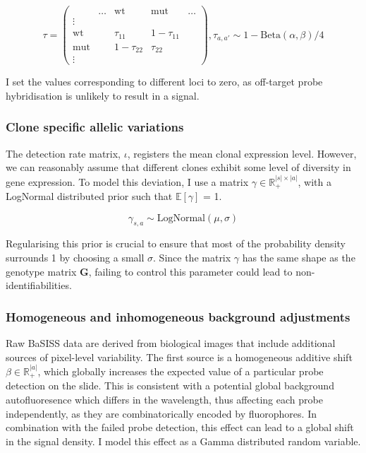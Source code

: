 \begin{equation}
 {\tau} = \left(\begin{array}{c|cccc}
       & \ldots & \text{wt} & \text{mut} & \ldots \\ 
\hline
 \vdots &  &        &        & \\
\text{wt}      &  & \tau_{11} & 1-\tau_{11} &  \\
\text{mut}     &  & 1-\tau_{22} & \tau_{22} &  \\
\vdots  &  &        &        & 
\end{array}\right), {\tau}_{a,a'} \sim 1-\text{Beta}(\alpha, \beta)/4
\end{equation}

I set the values corresponding to different loci to zero, as off-target probe hybridisation is unlikely to result in a signal.

\subsubsection*{Clone specific allelic variations}

The detection rate matrix, $\iota$, registers the mean clonal expression level. However, we can reasonably assume that different clones exhibit some level of diversity in gene expression. To model this deviation, I use a matrix $\gamma \in \mathbb{R}_{+}^{|s|\times|a|}$, with a LogNormal distributed prior such that $\mathbb{E}[\gamma]$ = 1.

\begin{equation} 
\gamma_{s,a} \sim \text{LogNormal}(\mu, \sigma)
\end{equation}

Regularising this prior is crucial to ensure that most of the probability density surrounds 1 by choosing a small $\sigma$. Since the matrix $\gamma$ has the same shape as the genotype matrix $\mathbf{G}$, failing to control this parameter could lead to non-identifiabilities.

\subsubsection*{Homogeneous and inhomogeneous background adjustments}
\label{sec:background_adjustment}
Raw BaSISS data are derived from biological images that include additional sources of pixel-level variability. The first source is a homogeneous additive shift $\beta \in \mathbb{R}_{+}^{|a|}$, which globally increases the expected value of a particular probe detection on the slide. This is consistent with a potential global background autofluoresence which differs in the wavelength, thus affecting each probe independently, as they are combinatorically encoded by fluorophores. In combination with the failed probe detection, this effect can lead to a global shift in the signal density. I model this effect as a Gamma distributed random variable.


